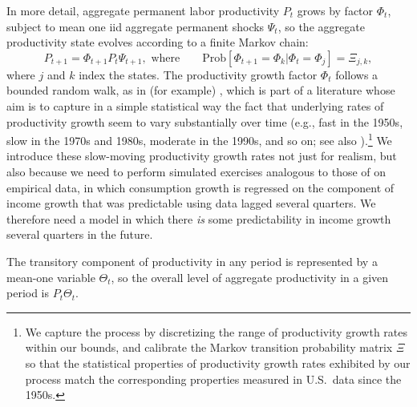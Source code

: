 \documentclass[titlepage]{./econtex}
\begin{document}
In more detail, aggregate permanent labor productivity $P_t$ grows by factor $\Phi_t$, subject to mean one iid aggregate permanent shocks $\Psi_t$, so the aggregate productivity state evolves according to a finite Markov chain:
\begin{equation}
{P}_{t+1} = \Phi_{t+1} {P}_{t}\Psi_{t+1}, \text{ where} \qquad\text{Prob}[\Phi_{t+1}=\Phi_k | \Phi_t = \Phi_j] = \Xi_{j,k},   \label{eq:AggRandWalk}
\end{equation}
where $j$ and $k$ index the states. The productivity growth factor $\Phi_t$ follows a bounded random walk, as in (for example) \cite{edge2007Learning}, which is part of a literature whose aim is to capture in a simple statistical way the fact that underlying rates of productivity growth seem to vary substantially over time (e.g., fast in the 1950s, slow in the 1970s and 1980s, moderate in the 1990s, and so on; see also \cite{jorgenson:ProductivityGrowthResurgence}).\footnote{We capture the process by discretizing the range of productivity growth rates within our bounds, and calibrate the Markov transition probability matrix $\Xi$ so that the statistical properties of productivity growth rates exhibited by our process match the corresponding properties measured in U.S.\ data since the 1950s.}  We introduce these slow-moving productivity growth rates not just for realism, but also because we need to perform simulated exercises analogous to those of \cite{cmModel} on empirical data, in which consumption growth is regressed on the component of income growth that was predictable using data lagged several quarters.  We therefore need a model in which there {\it is} some predictability in income growth several quarters in the future.

The transitory component of productivity in any period is represented by a mean-one variable $\Theta_t$, so the overall level of aggregate productivity in a given period is $P_{t}\Theta_{t}$.
\end{document}
